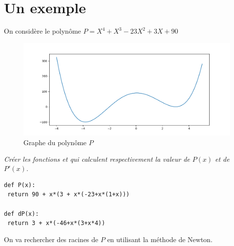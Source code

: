 \section{Un exemple}
On considère le polynôme $P=X^4+X^3-23X^2+3X+90$

\begin{figure}[h!]
   \centering
   \includegraphics[scale=0.6]{TP/Images/20_poly.png}
   \caption{\label{polyn} Graphe du polynôme $P$}
\end{figure}
\begin{Exercise}\it
Créer les fonctions  et  qui calculent respectivement la valeur de $P(x)$ et de $P'(x)$.
\end{Exercise}
\begin{Answer}
\begin{lstlisting}
def P(x):
 return 90 + x*(3 + x*(-23+x*(1+x)))
 
def dP(x):
 return 3 + x*(-46+x*(3+x*4))
\end{lstlisting}
\end{Answer}
\medskip

On va rechercher des racines de $P$ en utilisant la méthode de Newton. 

